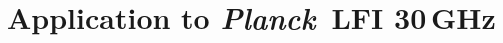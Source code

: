 \documentclass{aa}
\def\Planck{\textit{Planck}}
\begin{document}





\section{Application to \Planck\ LFI 30\,GHz}
\label{sec:lfi}
\end{document}
